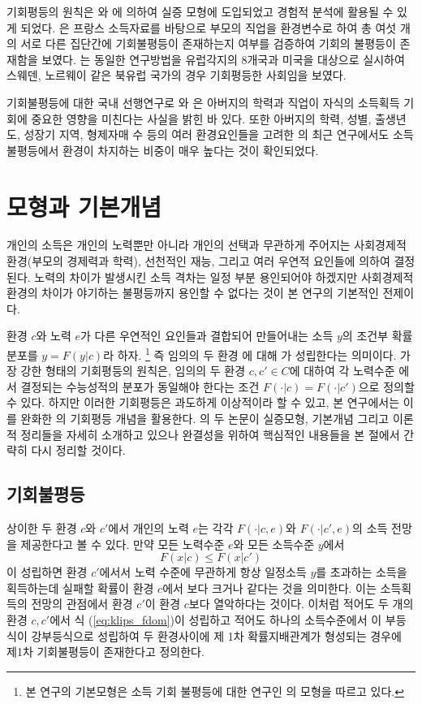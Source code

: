 기회평등의 원칙은 \citet{Roemer98}와 \citet{letl08, letl09}에 의하여 실증 모형에 도입되었고 경험적 분석에 활용될 수 있게 되었다.
 \citet{letl08}은 프랑스 소득자료를 바탕으로 부모의 직업을 환경변수로 하여 총 여섯 개의 서로 다른 집단간에 기회불평등이 존재하는지 여부를 검증하여 기회의 불평등이 존재함을 보였다.
 \citet{letl09}는 동일한 연구방법을 유럽각지의 8개국과 미국을 대상으로 실시하여 스웨덴, 노르웨이 같은 북유럽 국가의 경우 기회평등한 사회임을 보였다.
 
기회불평등에 대한 국내 선행연구로 \citet{knl08}와 \citet{knl11}은 아버지의 학력과 직업이 자식의 소득획득 기회에 중요한 영향을 미친다는 사실을 밝힌 바 있다.
 또한 아버지의 학력, 성별, 출생년도, 성장기 지역, 형제자매 수 등의 여러 환경요인들을 고려한 \citet{jnl16}의 최근 연구에서도 소득불평등에서 환경이 차지하는 비중이 매우 높다는 것이 확인되었다.

\section{모형과 기본개념}
개인의 소득은 개인의 노력뿐만 아니라 개인의 선택과 무관하게 주어지는 사회경제적 환경(부모의 경제력과 학력), 선천적인 재능, 그리고 여러 우연적 요인들에 의하여 결정된다.
노력의 차이가 발생시킨 소득 격차는 일정 부분 용인되어야 하겠지만 사회경제적 환경의 차이가 야기하는 불평등까지 용인할 수 없다는 것이 본 연구의 기본적인 전제이다.

환경 $c$와 노력 $e$가 다른 우연적인 요인들과 결합되어 만들어내는 소득 $y$의 조건부 확률분포를 $y=F(y|c)$라 하자. 
\footnote{본 연구의 기본모형은 소득 기회 불평등에 대한 연구인 \citet{letl08, letl09}의 모형을 따르고 있다.}
즉 임의의 두 환경 에 대해 가 성립한다는 의미이다.
가장 강한 형태의 기회평등의 원칙은, 임의의 두 환경 $c,c' \in C$에 대하여 각 노력수준 에서 결정되는 수능성적의 분포가 동일해야 한다는 조건 $F(\cdot | c) = F(\cdot | c')$으로 정의할 수 있다. 
하지만 이러한 기회평등은 과도하게 이상적이라 할 수 있고, 본 연구에서는 이를 완화한 \citet{letl08, letl09}의 기회평등 개념을 활용한다. 
\citeauthor{letl08}의 두 논문이 실증모형, 기본개념 그리고 이론적 정리들을 자세히 소개하고 있으나 완결성을 위하여 핵심적인 내용들을 본 절에서 간략히 다시 정리할 것이다.

\subsection{기회불평등}
 
 상이한 두 환경 $c$와 $c'$에서 개인의 노력 $e$는 각각 $F(\cdot |c,e)$와 $F(\cdot |c',e)$의 소득 전망을 제공한다고 볼 수 있다. 
만약 모든 노력수준 $e$와 모든 소득수준 $y$에서
\begin{equation}
    F(x | c) \leq F(x | c')
    \label{eq:klips_fdom}
\end{equation}
이 성립하면 환경 $c'$에서서 노력 수준에 무관하게 항상 일정소득 $y$를 초과하는 소득을 획득하는데 실패할 확률이 환경 $c$에서 보다 크거나 같다는 것을 의미한다.
이는 소득획득의 전망의 관점에서 환경 $c'$이 환경 $c$보다 열악하다는 것이다.
이처럼 적어도 두 개의 환경 $c,c'$에서 식 (\ref{eq:klips_fdom})이 성립하고 적어도 하나의 소득수준에서 이 부등식이 강부등식으로 성립하여 두 환경사이에 제 1차 확률지배관계가 형성되는 경우에 제1차 기회불평등이 존재한다고 정의한다.

